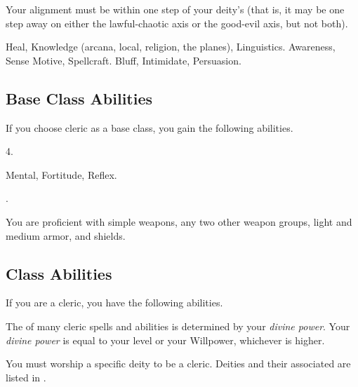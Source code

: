      Your alignment must be within one step of your deity's (that is, it may be one step away on either the lawful-chaotic axis or the good-evil axis, but not both).

     Heal, Knowledge (arcana, local, religion, the planes), Linguistics.
     Awareness, Sense Motive, Spellcraft.
     Bluff, Intimidate, Persuasion.

    \subsection{Base Class Abilities}
        If you choose cleric as a base class, you gain the following abilities.

         4.

          Mental,  Fortitude,  Reflex.

         .

        You are proficient with simple weapons, any two other weapon groups, light and medium armor, and shields.

    \subsection{Class Abilities}
        If you are a cleric, you have the following abilities.

        The  of many cleric spells and abilities is determined by your \textit{divine power}.
        Your \textit{divine power} is equal to your level or your Willpower, whichever is higher.

        You must worship a specific deity to be a cleric.
        Deities and their associated  are listed in .

